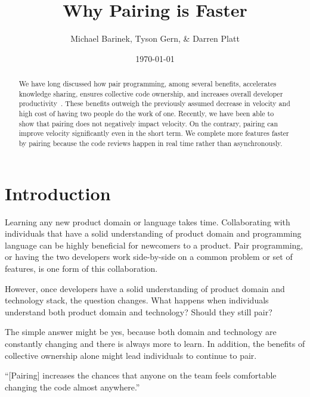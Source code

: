 \documentclass[letterpaper]{article}
\title{Why Pairing is Faster}
\author{Michael Barinek, Tyson Gern, \& Darren Platt}
\date{\today}
\theoremstyle{definition}
\begin{document}
    \maketitle

    \begin{abstract}
        We have long discussed how pair programming, among several benefits, accelerates knowledge sharing, ensures
        collective code ownership, and increases overall developer productivity~\cite{fowler:pairing}.
        These benefits outweigh the previously assumed decrease in velocity and high cost of having two people do
        the work of one.
        Recently, we have been able to show that pairing does not negatively impact velocity.
        On the contrary, pairing can improve velocity significantly even in the short term.
        We complete more features faster by pairing because the code reviews happen in real time rather than
        asynchronously.
    \end{abstract}


    \section{Introduction}\label{sec:introduction}

    Learning any new product domain or language takes time.
    Collaborating with individuals that have a solid understanding of product domain and programming language can be
    highly beneficial for newcomers to a product.
    Pair programming, or having the two developers work side-by-side on a common problem or set of features, is one form
    of this collaboration.

    However, once developers have a solid understanding of product domain and technology stack, the question changes.
    What happens when individuals understand both product domain and technology?
    Should they still pair?

    The simple answer might be yes, because both domain and technology are constantly changing and there is always more
    to learn.
    In addition, the benefits of collective ownership alone might lead individuals to continue to pair.

    \begin{displayquote}
        ``{[Pairing]} increases the chances that anyone on the team feels comfortable changing the code almost anywhere.''
    \end{displayquote}
\end{document}
